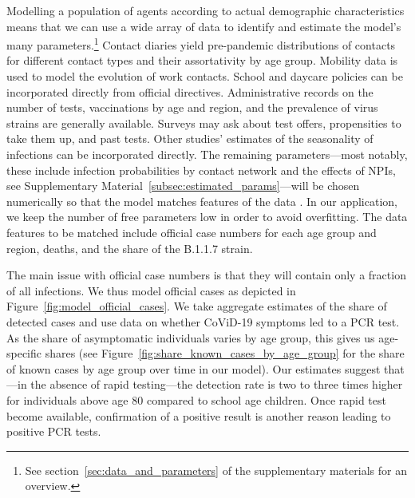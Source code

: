 Modelling a population of agents according to actual demographic characteristics means
that we can use a wide array of data to identify and estimate the model's many
parameters.\footnote{See section~\ref{sec:data_and_parameters} of the supplementary
materials for an overview.} Contact diaries yield pre-pandemic distributions of contacts
for different contact types and their assortativity by age group. Mobility data is used
to model the evolution of work contacts. School and daycare policies can be incorporated
directly from official directives. Administrative records on the number of tests,
vaccinations by age and region, and the prevalence of virus strains are generally
available. Surveys may ask about test offers, propensities to take them up, and past
tests. Other studies' estimates of the seasonality of infections can be incorporated
directly. The remaining parameters---most notably, these include infection probabilities
by contact network and the effects of NPIs, see Supplementary
Material~\ref{subsec:estimated_params}---will be chosen numerically so that the model
matches features of the data \citep[see][for the general method, also described in
Supplementary Material \ref{sec:model}]{McFadden1989}. In our application, we keep the number of free
parameters low in order to avoid overfitting. The data features to be matched include
official case numbers for each age group and region, deaths, and the share of the B.1.1.7
strain.

The main issue with official case numbers is that they will contain only a fraction of
all infections. We thus model official cases as depicted in
Figure~\ref{fig:model_official_cases}. We take aggregate estimates of the share of
detected cases and use data on whether CoViD-19 symptoms led to a PCR test. As the share
of asymptomatic individuals varies by age group, this gives us age-specific shares (see
Figure~\ref{fig:share_known_cases_by_age_group} for the share of known cases by age
group over time in our model). Our estimates suggest that---in the absence of rapid
testing---the detection rate is two to three times higher for individuals above age 80
compared to school age children.
Once rapid test become available, confirmation of a positive result is another reason
leading to positive PCR tests.

